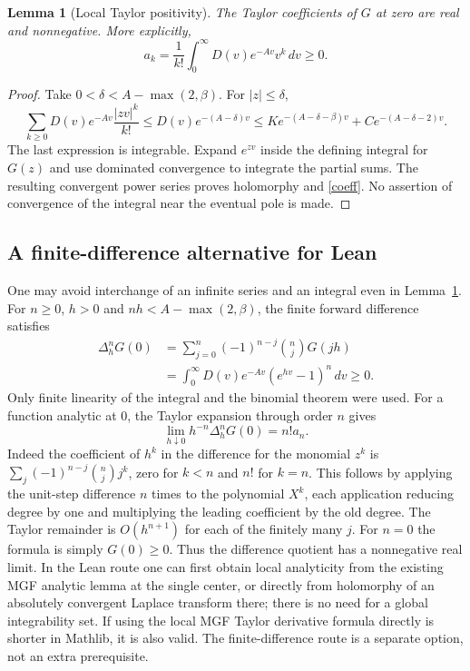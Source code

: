 \documentclass[11pt]{article}
\newtheorem{lemma}[theorem]{Lemma}
\theoremstyle{remark}\newtheorem{remark}[theorem]{Remark}
\begin{document}
\begin{lemma}[Local Taylor positivity]\label{lem:positive}
The Taylor coefficients of $G$ at zero are real and nonnegative. More explicitly,
\begin{equation}\label{coeff}
 a_k=\frac1{k!}\int_0^\infty D(v)e^{-Av}v^k\,dv\ge0.
\end{equation}
\end{lemma}
\begin{proof}
Take $0<\delta<A-\max(2,\beta)$. For $|z|\le\delta$,
\[
 \sum_{k\ge0}D(v)e^{-Av}\frac{|zv|^k}{k!}
 \le D(v)e^{-(A-\delta)v}
 \le K e^{-(A-\delta-\beta)v}+C e^{-(A-\delta-2)v}.
\]
The last expression is integrable. Expand $e^{zv}$ inside the defining integral for $G(z)$ and use dominated convergence to integrate the partial sums. The resulting convergent power series proves holomorphy and \eqref{coeff}. No assertion of convergence of the integral near the eventual pole is made.
\end{proof}

\subsection{A finite-difference alternative for Lean}
One may avoid interchange of an infinite series and an integral even in Lemma~\ref{lem:positive}. For $n\ge0$, $h>0$ and $nh<A-\max(2,\beta)$, the finite forward difference satisfies
\begin{align*}
 \Delta_h^nG(0)&=\sum_{j=0}^n(-1)^{n-j}\binom njG(jh)\\
 &=\int_0^\infty D(v)e^{-Av}(e^{hv}-1)^n\,dv\ge0.
\end{align*}
Only finite linearity of the integral and the binomial theorem were used. For a function analytic at $0$, the Taylor expansion through order $n$ gives
\begin{equation}\label{difflim}
 \lim_{h\downarrow0}h^{-n}\Delta_h^nG(0)=n!a_n.
\end{equation}
Indeed the coefficient of $h^k$ in the difference for the monomial $z^k$ is $\sum_j(-1)^{n-j}\binom nj j^k$, zero for $k<n$ and $n!$ for $k=n$. This follows by applying the unit-step difference $n$ times to the polynomial $X^k$, each application reducing degree by one and multiplying the leading coefficient by the old degree. The Taylor remainder is $O(h^{n+1})$ for each of the finitely many $j$. For $n=0$ the formula is simply $G(0)\ge0$. Thus the difference quotient has a nonnegative real limit. In the Lean route one can first obtain local analyticity from the existing MGF analytic lemma at the single center, or directly from holomorphy of an absolutely convergent Laplace transform there; there is no need for a global integrability set. If using the local MGF Taylor derivative formula directly is shorter in Mathlib, it is also valid. The finite-difference route is a separate option, not an extra prerequisite.
\end{document}
